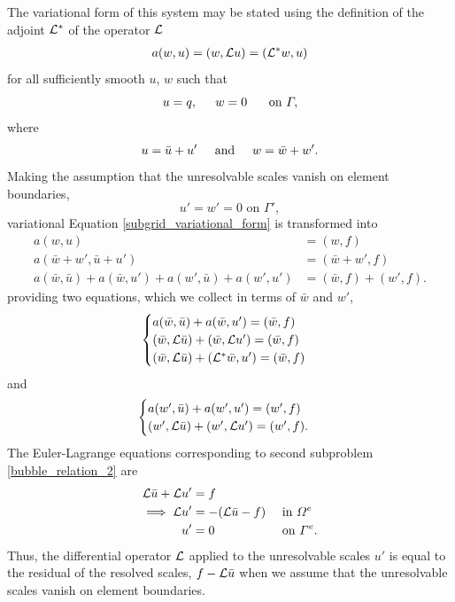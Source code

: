 The variational form of this system may be stated using the definition of the   adjoint $\Lu^*$ of the operator $\Lu$
\begin{align}
  \label{subgrid_variational_form}
  a(w,u) = (w, \Lu u) = (\Lu^* w, u)
\end{align}
for all sufficiently smooth $u$, $w$ such that
$$u = q, \hspace{5mm} w = 0 \hspace{5mm} \text{ on } \Gamma,$$
where
\begin{align*}
  u = \bar{u} + u'  \hspace{5mm} \text{and} \hspace{5mm}
  w = \bar{w} + w'.
\end{align*}
Making the assumption that the unresolvable scales vanish on element boundaries,
$$u' = w' = 0 \text{ on } \Gamma',$$
variational Equation \cref{subgrid_variational_form} is transformed into
\begin{align*}
  a(w,u) &= (w,f) \\
  a(\bar{w} + w', \bar{u} + u') &= (\bar{w} + w', f) \\
  a(\bar{w}, \bar{u}) + a(\bar{w}, u') + a(w', \bar{u}) + a(w',u')  &= (\bar{w}, f) + (w',f).
\end{align*}
providing two equations, which we collect in terms of $\bar{w}$ and $w'$,
\begin{align}
  \label{bubble_relation_1}
  \begin{cases}
    a(\bar{w}, \bar{u}) + a(\bar{w}, u') = (\bar{w}, f) \\
    (\bar{w}, \Lu \bar{u}) + (\bar{w}, \Lu u') = (\bar{w}, f) \\
    (\bar{w}, \Lu \bar{u}) + (\Lu^* \bar{w}, u') = (\bar{w}, f)
  \end{cases}
\end{align}
and
\begin{align}
  \label{bubble_relation_2}
  \begin{cases}
    a(w', \bar{u}) + a(w',u')  = (w',f) \\
    (w', \Lu \bar{u}) + (w', \Lu u')  = (w',f).
  \end{cases}
\end{align}
The Euler-Lagrange equations corresponding to second subproblem \cref{bubble_relation_2} are
\begin{align}
  \Lu \bar{u} + \Lu u' &= f && \notag \\
  \label{bubble_euler_lagrange}
  \implies \Lu u' &= - (\Lu\bar{u} - f) &&\text{ in } \Omega^e \\
               u' &= 0 &&\text{ on } \Gamma^e. \notag
\end{align}
Thus, the differential operator $\Lu$ applied to the unresolvable scales $u'$ is equal to the residual of the resolved scales, $f - \Lu \bar{u}$ when we assume that the unresolvable scales vanish on element boundaries.




